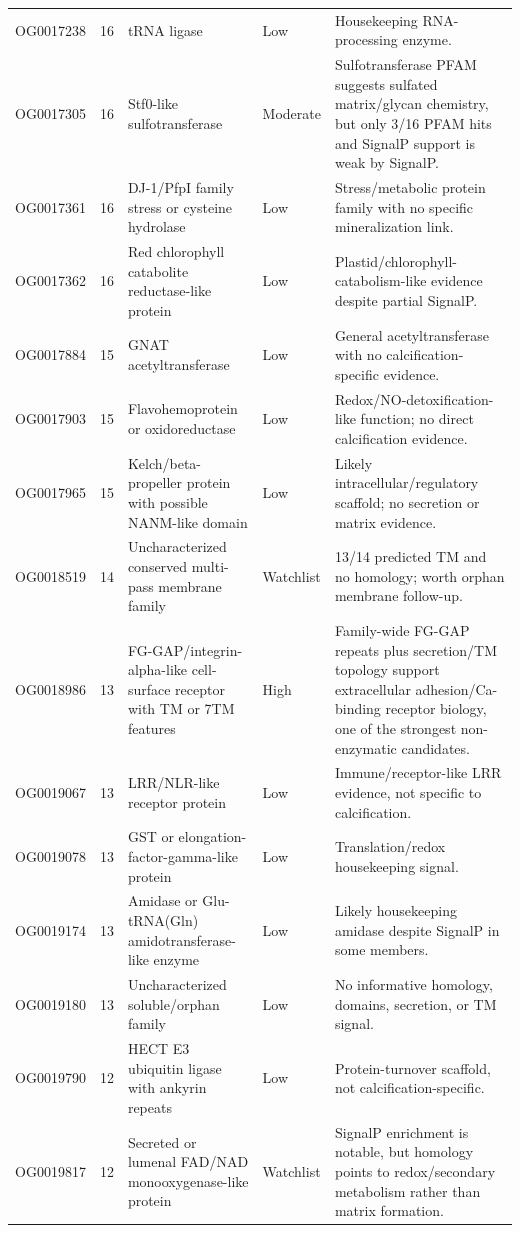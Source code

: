 \begin{longtable}{p{1.9cm}r p{4.55cm}p{1.8cm}p{5.55cm}}
OG0017238 & 16 & tRNA ligase & Low & Housekeeping RNA-processing enzyme.\\
OG0017305 & 16 & Stf0-like sulfotransferase & Moderate & Sulfotransferase PFAM suggests sulfated matrix/glycan chemistry, but only 3/16 PFAM hits and SignalP support is weak by SignalP.\\
OG0017361 & 16 & DJ-1/PfpI family stress or cysteine hydrolase & Low & Stress/metabolic protein family with no specific mineralization link.\\
OG0017362 & 16 & Red chlorophyll catabolite reductase-like protein & Low & Plastid/chlorophyll-catabolism-like evidence despite partial SignalP.\\
OG0017884 & 15 & GNAT acetyltransferase & Low & General acetyltransferase with no calcification-specific evidence.\\
OG0017903 & 15 & Flavohemoprotein or oxidoreductase & Low & Redox/NO-detoxification-like function; no direct calcification evidence.\\
OG0017965 & 15 & Kelch/beta-propeller protein with possible NANM-like domain & Low & Likely intracellular/regulatory scaffold; no secretion or matrix evidence.\\
OG0018519 & 14 & Uncharacterized conserved multi-pass membrane family & Watchlist & 13/14 predicted TM and no homology; worth orphan membrane follow-up.\\
OG0018986 & 13 & FG-GAP/integrin-alpha-like cell-surface receptor with TM or 7TM features & High & Family-wide FG-GAP repeats plus secretion/TM topology support extracellular adhesion/Ca-binding receptor biology, one of the strongest non-enzymatic candidates.\\
OG0019067 & 13 & LRR/NLR-like receptor protein & Low & Immune/receptor-like LRR evidence, not specific to calcification.\\
OG0019078 & 13 & GST or elongation-factor-gamma-like protein & Low & Translation/redox housekeeping signal.\\
OG0019174 & 13 & Amidase or Glu-tRNA(Gln) amidotransferase-like enzyme & Low & Likely housekeeping amidase despite SignalP in some members.\\
OG0019180 & 13 & Uncharacterized soluble/orphan family & Low & No informative homology, domains, secretion, or TM signal.\\
OG0019790 & 12 & HECT E3 ubiquitin ligase with ankyrin repeats & Low & Protein-turnover scaffold, not calcification-specific.\\
OG0019817 & 12 & Secreted or lumenal FAD/NAD monooxygenase-like protein & Watchlist & SignalP enrichment is notable, but homology points to redox/secondary metabolism rather than matrix formation.\\

\end{longtable}
